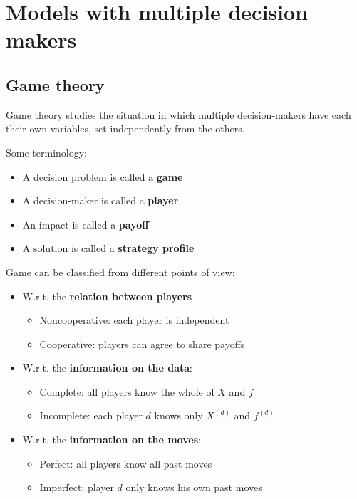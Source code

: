 \section{Models with multiple decision makers}

\subsection{Game theory}

Game theory studies the situation in which multiple decision-makers have each their own variables, set independently from the others.

Some terminology:
\begin{itemize}
	\item A decision problem is called a \textbf{game}
	
	\item A decision-maker is called a \textbf{player} 
	
	\item An impact is called a \textbf{payoff}
	
	\item A solution is called a \textbf{strategy profile}
\end{itemize}

Game can be classified from different points of view: 
\begin{itemize}
	\item W.r.t. the \textbf{relation between players}
	\begin{itemize}
		\item Noncooperative: each player is independent 
		
		\item Cooperative: players can agree to share payoffs
	\end{itemize}
	
	\item W.r.t. the \textbf{information on the data}:
	\begin{itemize}
		\item Complete: all players know the whole of $X$ and $f$
		
		\item Incomplete: each player $d$ knows only $X^{(d)}$ and $f^{(d)}$
	\end{itemize}
	
	\item W.r.t. the \textbf{information on the moves}:
	\begin{itemize}
		\item Perfect: all players know all past moves 
		
		\item Imperfect: player $d$ only knows his own past moves
	\end{itemize}
\end{itemize}

